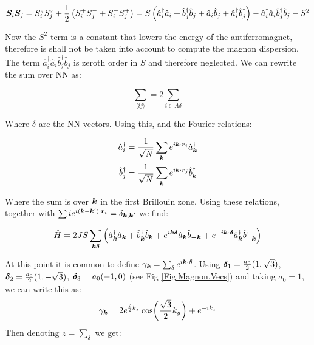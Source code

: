 \begin{align*}
\boldsymbol{S}_i\boldsymbol{S}_j = S_i^zS_j^z + \frac{1}{2}\left(S_i^+S_j^- + S_i^-S_j^+ \right) = S \left( \hat{a}^\dagger_i \hat{a}_i + \hat{b}^\dagger_j \hat{b}_j + \hat{a}_i\hat{b}_j + \hat{a}^\dagger_i\hat{b}^\dagger_j \right) - \hat{a}^\dagger_i \hat{a}_i\hat{b}^\dagger_j \hat{b}_j - S^2
\end{align*}

Now the $S^2$ term is a constant that lowers the energy of the antiferromagnet, therefore is shall not be taken into account to compute the magnon dispersion. The term $\hat{a}^\dagger_i \hat{a}_i\hat{b}^\dagger_j \hat{b}_j$ is zeroth order in $S$ and therefore neglected. We can rewrite the sum over NN as:

\begin{equation}
\sum_{\langle i j \rangle} = 2\sum_{i \in A \delta}
\end{equation}

Where $\delta$ are the NN vectors. Using this, and the Fourier relations:

\begin{align}
\hat{a}_i^\dagger &= \frac{1}{\sqrt{N}} \sum_{\boldsymbol{k}} e^{i \boldsymbol{k} \cdot \boldsymbol{r}_i} \hat{a}_{\boldsymbol{k}}^\dagger \\
\hat{b}_j^\dagger &= \frac{1}{\sqrt{N}} \sum_{\boldsymbol{k}} e^{i \boldsymbol{k} \cdot \boldsymbol{r}_j} \hat{b}_{\boldsymbol{k}}^\dagger
\end{align}

Where the sum is over $\boldsymbol{k}$ in the first Brillouin zone. Using these relations, together with $\sum{i} e^{i(\boldsymbol{k}-\boldsymbol{k}')\cdot\boldsymbol{r}_i} = \delta_{\boldsymbol{k}, \boldsymbol{k}'}$ we find:

\begin{equation}
\hat{H} = 2JS \sum_{\boldsymbol{k} \boldsymbol{\delta}} \left( \hat{a}^\dagger_{\boldsymbol{k}}\hat{a}_{\boldsymbol{k}} + \hat{b}^\dagger_{\boldsymbol{k}}\hat{b}_{\boldsymbol{k}} + e^{i\boldsymbol{k}\boldsymbol{\delta}}\hat{a}_{\boldsymbol{k}}\hat{b}_{\boldsymbol{-k}} + e^{-i \boldsymbol{k}\cdot\boldsymbol{\delta}}  \hat{a}^\dagger_{\boldsymbol{k}}\hat{b}^\dagger_{-\boldsymbol{k}} \right)
\end{equation}

At this point it is common to define $\gamma_{\boldsymbol{k}} = \sum_\delta e^{i \boldsymbol{k} \cdot \boldsymbol{\delta}}$. Using $\boldsymbol{\delta}_1=\frac{a_0}{2}(1,\sqrt{3})$, $\boldsymbol{\delta}_2=\frac{a_0}{2}(1,-\sqrt{3})$, $\boldsymbol{\delta}_3=a_0(-1,0)$ (see Fig \ref{Fig.Magnon.Vecs}) and taking $a_0=1$, we can write this as:
\begin{equation}
\gamma_{\boldsymbol{k}} = 2e^{\frac{i}{2}k_x}\cos(\frac{\sqrt{3}}{2}k_y)+e^{-ik_x}
\end{equation}
Then denoting $z = \sum_\delta$ we get:

